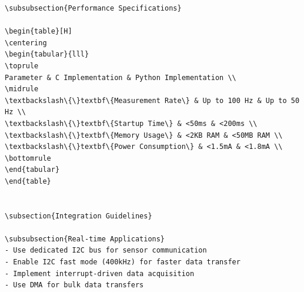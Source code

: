 \documentclass[11pt,a4paper]{article}
\begin{document}
\begin{lstlisting}[language=text]
\subsubsection{Performance Specifications}

\begin{table}[H]
\centering
\begin{tabular}{lll}
\toprule
Parameter & C Implementation & Python Implementation \\
\midrule
\textbackslash\{\}textbf\{Measurement Rate\} & Up to 100 Hz & Up to 50 Hz \\
\textbackslash\{\}textbf\{Startup Time\} & <50ms & <200ms \\
\textbackslash\{\}textbf\{Memory Usage\} & <2KB RAM & <50MB RAM \\
\textbackslash\{\}textbf\{Power Consumption\} & <1.5mA & <1.8mA \\
\bottomrule
\end{tabular}
\end{table}


\subsection{Integration Guidelines}

\subsubsection{Real-time Applications}
- Use dedicated I2C bus for sensor communication
- Enable I2C fast mode (400kHz) for faster data transfer
- Implement interrupt-driven data acquisition
- Use DMA for bulk data transfers


\end{lstlisting}
\end{document}

